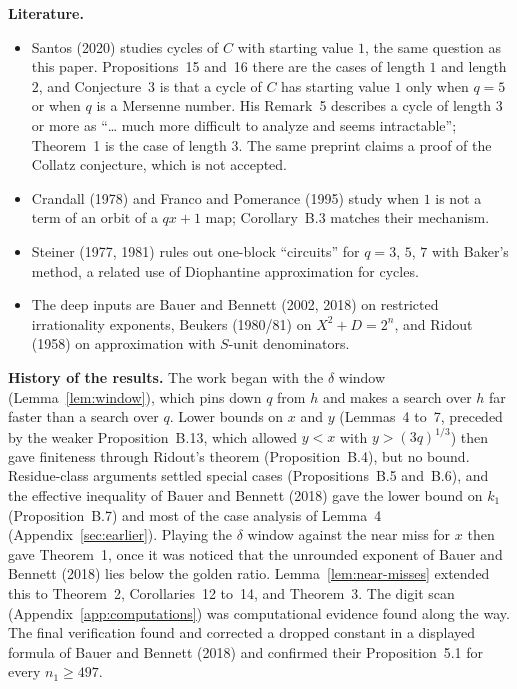 \documentclass[11pt]{article}
\newcommand{\topic}[1]{\par\noindent\textbf{#1}}
\begin{document}
\topic{Literature.}
\begin{itemize}
\item Santos (2020) studies cycles of $C$ with starting value $1$, the same question as this paper.
Propositions~15 and~16 there are the cases of length $1$ and length $2$, and Conjecture~3 is that a cycle of $C$ has starting value $1$ only when $q = 5$ or when $q$ is a Mersenne number.
His Remark~5 describes a cycle of length $3$ or more as ``\ldots{} much more difficult to analyze and seems intractable''; Theorem~1 is the case of length $3$.
The same preprint claims a proof of the Collatz conjecture, which is not accepted.
\item Crandall (1978) and Franco and Pomerance (1995) study when $1$ is not a term of an orbit of a $qx+1$ map; Corollary~B.3 matches their mechanism.
\item Steiner (1977, 1981) rules out one-block ``circuits'' for $q = 3$, $5$, $7$ with Baker's method, a related use of Diophantine approximation for cycles.
\item The deep inputs are Bauer and Bennett (2002, 2018) on restricted irrationality exponents, Beukers (1980/81) on $X^2 + D = 2^n$, and Ridout (1958) on approximation with $S$-unit denominators.
\end{itemize}

\topic{History of the results.}
The work began with the $\delta$ window (Lemma~\ref{lem:window}), which pins down $q$ from $h$ and makes a search over $h$ far faster than a search over $q$.
Lower bounds on $x$ and $y$ (Lemmas~4 to~7, preceded by the weaker Proposition~B.13, which allowed $y < x$ with $y > (3q)^{1/3}$) then gave finiteness through Ridout's theorem (Proposition~B.4), but no bound.
Residue-class arguments settled special cases (Propositions~B.5 and~B.6), and the effective inequality of Bauer and Bennett (2018) gave the lower bound on $k_1$ (Proposition~B.7) and most of the case analysis of Lemma~4 (Appendix~\ref{sec:earlier}). Playing the $\delta$ window against the near miss for $x$ then gave Theorem~1, once it was noticed that the unrounded exponent of Bauer and Bennett (2018) lies below the golden ratio.
Lemma~\ref{lem:near-misses} extended this to Theorem~2, Corollaries~12 to~14, and Theorem~3.
The digit scan (Appendix~\ref{app:computations}) was computational evidence found along the way.
The final verification found and corrected a dropped constant in a displayed formula of Bauer and Bennett (2018) and confirmed their Proposition~5.1 for every $n_1 \ge 497$.
\end{document}
